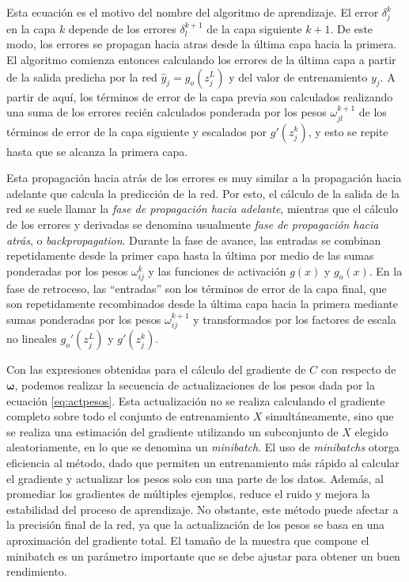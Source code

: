 Esta ecuación es el motivo del nombre del algoritmo de aprendizaje. El error $\delta_j^k$ en la capa $k$ depende de los errores $\delta_l^{k+1}$ de la capa siguiente $k+1$. De este modo, los errores se propagan hacia atras desde la última capa hacia la primera. El algoritmo comienza entonces calculando los errores de la última capa a partir de la salida predicha por la red $\hat{y}_j = g_o(z_j^L)$ y del valor de entrenamiento $y_j$. A partir de aquí, los términos de error de la capa previa son calculados realizando una suma de los errores recién calculados ponderada por los pesos $\omega_{jl}^{k+1}$ de los términos de error de la capa siguiente y escalados por $g'(z_j^k)$, y esto se repite hasta que se alcanza la primera capa.

Esta propagación hacia atrás de los errores es muy similar a la propagación hacia adelante que calcula la predicción de la red. Por esto, el cálculo de la salida de la red se suele llamar la \textit{fase de propagación hacia adelante}, mientras que el cálculo de los errores y derivadas se denomina usualmente \textit{fase de propagación hacia atrás}, o \textit{backpropagation}. Durante la fase de avance, las entradas se combinan repetidamente desde la primer capa hasta la última por medio de las sumas ponderadas por los pesos $\omega_{ij}^k$ y las funciones de activación $g(x)$ y $g_o(x)$. En la fase de retroceso, las ``entradas'' son los términos de error de la capa final, que son repetidamente recombinados desde la última capa hacia la primera mediante sumas ponderadas por los pesos $\omega_{ij}^{k+1}$ y transformados por los factores de escala no lineales $g_o'(z_j^L)$ y $g'(z_j^k)$.

Con las expresiones obtenidas para el cálculo del gradiente de $C$ con respecto de $\bm{\omega}$, podemos realizar la secuencia de actualizaciones de los pesos dada por la ecuación \eqref{eq:actpesos}. Esta actualización no se realiza calculando el gradiente completo sobre todo el conjunto de entrenamiento $X$ simultáneamente, sino que se realiza una estimación del gradiente utilizando un subconjunto de $X$ elegido aleatoriamente, en lo que se denomina un \textit{minibatch}. El uso de \textit{minibatchs} otorga eficiencia al método, dado que permiten un entrenamiento más rápido al calcular el gradiente y actualizar los pesos solo con una parte de los datos. Además, al promediar los gradientes de múltiples ejemplos, reduce el ruido y mejora la estabilidad del proceso de aprendizaje. No obstante, este método puede afectar a la precisión final de la red, ya que la actualización de los pesos se basa en una aproximación del gradiente total. El tamaño de la muestra que compone el minibatch es un parámetro importante que se debe ajustar para obtener un buen rendimiento.

